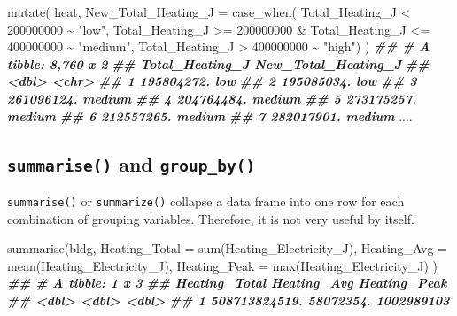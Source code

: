 \documentclass[
]{book}
\newenvironment{Shaded}{\begin{snugshade}}{\end{snugshade}}
\newcommand{\AttributeTok}[1]{\textcolor[rgb]{0.77,0.63,0.00}{#1}}
\newcommand{\DecValTok}[1]{\textcolor[rgb]{0.00,0.00,0.81}{#1}}
\newcommand{\DocumentationTok}[1]{\textcolor[rgb]{0.56,0.35,0.01}{\textbf{\textit{#1}}}}
\newcommand{\FunctionTok}[1]{\textcolor[rgb]{0.00,0.00,0.00}{#1}}
\newcommand{\NormalTok}[1]{#1}
\newcommand{\SpecialCharTok}[1]{\textcolor[rgb]{0.00,0.00,0.00}{#1}}
\newcommand{\StringTok}[1]{\textcolor[rgb]{0.31,0.60,0.02}{#1}}
\begin{document}
\begin{Shaded}
\begin{Highlighting}[]
\FunctionTok{mutate}\NormalTok{(}
\NormalTok{  heat,}
  \AttributeTok{New\_Total\_Heating\_J =} \FunctionTok{case\_when}\NormalTok{(}
\NormalTok{    Total\_Heating\_J }\SpecialCharTok{\textless{}} \DecValTok{200000000} \SpecialCharTok{\textasciitilde{}} \StringTok{"low"}\NormalTok{,}
\NormalTok{    Total\_Heating\_J }\SpecialCharTok{\textgreater{}=} \DecValTok{200000000} \SpecialCharTok{\&}\NormalTok{ Total\_Heating\_J }\SpecialCharTok{\textless{}=} \DecValTok{400000000} \SpecialCharTok{\textasciitilde{}} \StringTok{"medium"}\NormalTok{,}
\NormalTok{    Total\_Heating\_J }\SpecialCharTok{\textgreater{}} \DecValTok{400000000} \SpecialCharTok{\textasciitilde{}} \StringTok{"high"}\NormalTok{)}
\NormalTok{  )}
\DocumentationTok{\#\# \# A tibble: 8,760 x 2}
\DocumentationTok{\#\#    Total\_Heating\_J New\_Total\_Heating\_J}
\DocumentationTok{\#\#              \textless{}dbl\textgreater{} \textless{}chr\textgreater{}              }
\DocumentationTok{\#\#  1      195804272. low                }
\DocumentationTok{\#\#  2      195085034. low                }
\DocumentationTok{\#\#  3      261096124. medium             }
\DocumentationTok{\#\#  4      204764484. medium             }
\DocumentationTok{\#\#  5      273175257. medium             }
\DocumentationTok{\#\#  6      212557265. medium             }
\DocumentationTok{\#\#  7      282017901. medium             }
\NormalTok{....}
\end{Highlighting}
\end{Shaded}

\hypertarget{summarise-and-group_by}{%
\subsection{\texorpdfstring{\texttt{summarise()} and \texttt{group\_by()}}{summarise() and group\_by()}}\label{summarise-and-group_by}}

\texttt{summarise()} or \texttt{summarize()} collapse a data frame into one row for each combination of grouping variables. Therefore, it is not very useful by itself.

\begin{Shaded}
\begin{Highlighting}[]
\FunctionTok{summarise}\NormalTok{(bldg,}
  \AttributeTok{Heating\_Total =} \FunctionTok{sum}\NormalTok{(Heating\_Electricity\_J),}
  \AttributeTok{Heating\_Avg =} \FunctionTok{mean}\NormalTok{(Heating\_Electricity\_J),}
  \AttributeTok{Heating\_Peak =} \FunctionTok{max}\NormalTok{(Heating\_Electricity\_J)}
\NormalTok{)}
\DocumentationTok{\#\# \# A tibble: 1 x 3}
\DocumentationTok{\#\#   Heating\_Total Heating\_Avg Heating\_Peak}
\DocumentationTok{\#\#           \textless{}dbl\textgreater{}       \textless{}dbl\textgreater{}        \textless{}dbl\textgreater{}}
\DocumentationTok{\#\# 1 508713824519.   58072354.   1002989103}
\end{Highlighting}
\end{Shaded}
\end{document}
